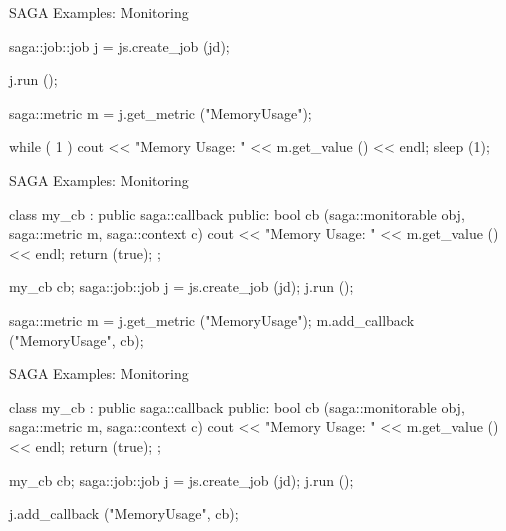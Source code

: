 \documentclass[%
  pdf,
  colorBG,
  slideColor,
  frames,
  ogf
]{prosper}
\begin{document}

 \begin{slide}{SAGA Examples: Monitoring}

  \begin{mycode}[label=pull monitoring]

  saga::job::job j = js.create_job (jd);

  j.run ();

  saga::metric m = j.get_metric ("MemoryUsage");

  while ( 1 )
  {
    cout << "Memory Usage: " << m.get_value () << endl;
    sleep (1);
  }

  \end{mycode}
   
 \end{slide}


 \begin{slide}{SAGA Examples: Monitoring}

  \begin{mycode}[label=callbacks]
  class my_cb : public saga::callback 
  {
    public: 
      bool cb (saga::monitorable obj, 
               saga::metric      m, 
               saga::context     c)
      {
        cout << "Memory Usage: " << m.get_value () << endl;
        return (true);
      }
  };

  my_cb cb;
  saga::job::job j = js.create_job (jd);
  j.run ();

  saga::metric m = j.get_metric ("MemoryUsage");
  m.add_callback ("MemoryUsage", cb);
  \end{mycode}
   
 \end{slide}


 \begin{slide}{SAGA Examples: Monitoring}

  \begin{mycode}[label=callbacks]
  class my_cb : public saga::callback 
  {
    public: 
      bool cb (saga::monitorable obj, 
               saga::metric      m, 
               saga::context     c)
      {
        cout << "Memory Usage: " << m.get_value () << endl;
        return (true);
      }
  };

  my_cb cb;
  saga::job::job j = js.create_job (jd);
  j.run ();


  j.add_callback ("MemoryUsage", cb);
  \end{mycode}
   
 \end{slide}
\end{document}
